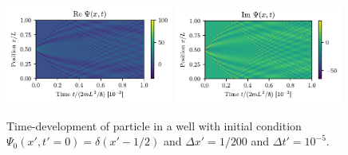 \begin{figure}[ht!]%
\centering%
\includegraphics[width=0.49\textwidth]{figs/box_deltaf_real.pdf}%
\includegraphics[width=0.49\textwidth]{figs/box_deltaf_imag.pdf}%
\caption{Time-development of particle in a well with initial condition $\Psi_0(x',t'=0) = \delta(x' - 1/2)$ and $\Delta x' = 1/200$ and $\Delta t' = 10^{-5}$. \label{fig:box_time_deltaf}}%
\end{figure}

